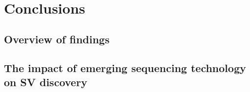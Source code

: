 \chapter{Conclusions}
\label{sec:conclusions}

\section{Overview of findings}
\label{sec:findings}

\section{The impact of emerging sequencing technology on SV discovery}
\label{sec:impact}
